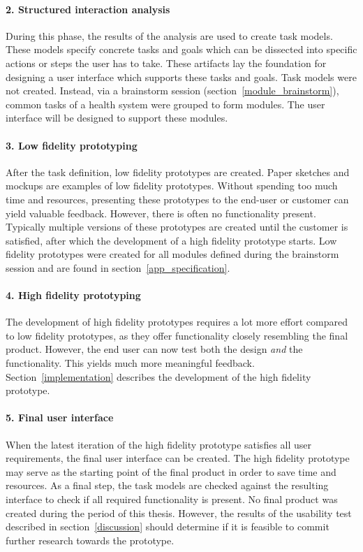         \paragraph{2. Structured interaction analysis} During this phase, the results of the analysis are used to create task models. These models specify concrete tasks and goals which can be dissected into specific actions or steps the user has to take. These artifacts lay the foundation for designing a user interface which supports these tasks and goals. Task models were not created. Instead, via a brainstorm session (section~\ref{module_brainstorm}), common tasks of a health system were grouped to form modules. The user interface will be designed to support these modules.

        \paragraph{3. Low fidelity prototyping} After the task definition, low fidelity prototypes are created. Paper sketches and mockups are examples of low fidelity prototypes. Without spending too much time and resources, presenting these prototypes to the end-user or customer can yield valuable feedback. However, there is often no functionality present. Typically multiple versions of these prototypes are created until the customer is satisfied, after which the development of a high fidelity prototype starts. Low fidelity prototypes were created for all modules defined during the brainstorm session and are found in section~\ref{app_specification}.

        \paragraph{4. High fidelity prototyping} The development of high fidelity prototypes requires a lot more effort compared to low fidelity prototypes, as they offer functionality closely resembling the final product. However, the end user can now test both the design \emph{and} the functionality. This yields much more meaningful feedback. Section~\ref{implementation} describes the development of the high fidelity prototype.

        \paragraph{5. Final user interface} When the latest iteration of the high fidelity prototype satisfies all user requirements, the final user interface can be created. The high fidelity prototype may serve as the starting point of the final product in order to save time and resources. As a final step, the task models are checked against the resulting interface to check if all required functionality is present. No final product was created during the period of this thesis. However, the results of the usability test described in section~\ref{discussion} should determine if it is feasible to commit further research towards the prototype.

